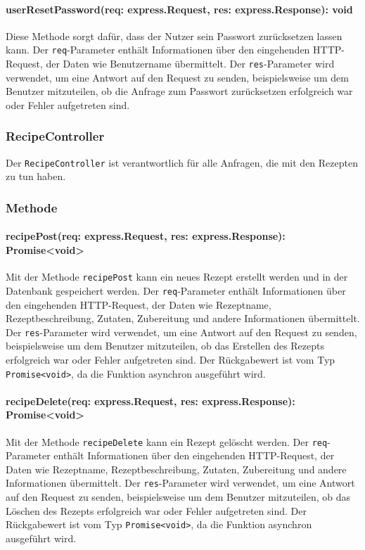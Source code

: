 \documentclass{entwurfsheft}
\begin{document}
\paragraph{userResetPassword(req: express.Request, res: express.Response): void}
Diese Methode sorgt dafür, dass der Nutzer sein Passwort zurücksetzen lassen kann. Der \texttt{req}-Parameter enthält Informationen über den eingehenden HTTP-Request, der Daten wie Benutzername übermittelt. Der \texttt{res}-Parameter wird verwendet, um eine Antwort auf den Request zu senden, beispielsweise um dem Benutzer mitzuteilen, ob die Anfrage zum Passwort zurücksetzen erfolgreich war oder Fehler aufgetreten sind. 

\subsubsection{RecipeController}\label{sec:RecipeController}
Der \texttt{RecipeController} ist verantwortlich für alle Anfragen, die mit den Rezepten zu tun haben.
\subsubsection*{Methode}
\paragraph{recipePost(req: express.Request, res: express.Response): Promise<void>}
Mit der Methode \texttt{recipePost} kann ein neues Rezept erstellt werden und in der Datenbank gespeichert werden. Der \texttt{req}-Parameter enthält Informationen über den eingehenden HTTP-Request, der Daten wie Rezeptname, Rezeptbeschreibung, Zutaten, Zubereitung und andere Informationen übermittelt. Der \texttt{res}-Parameter wird verwendet, um eine Antwort auf den Request zu senden, beispielsweise um dem Benutzer mitzuteilen, ob das Erstellen des Rezepts erfolgreich war oder Fehler aufgetreten sind.
Der Rückgabewert ist vom Typ \texttt{Promise<void>}, da die Funktion asynchron ausgeführt wird.
\paragraph{recipeDelete(req: express.Request, res: express.Response): Promise<void>}
Mit der Methode \texttt{recipeDelete} kann ein Rezept gelöscht werden. Der \texttt{req}-Parameter enthält Informationen über den eingehenden HTTP-Request, der Daten wie Rezeptname, Rezeptbeschreibung, Zutaten, Zubereitung und andere Informationen übermittelt. Der \texttt{res}-Parameter wird verwendet, um eine Antwort auf den Request zu senden, beispielsweise um dem Benutzer mitzuteilen, ob das Löschen des Rezepts erfolgreich war oder Fehler aufgetreten sind.
Der Rückgabewert ist vom Typ \texttt{Promise<void>}, da die Funktion asynchron ausgeführt wird.
\end{document}
